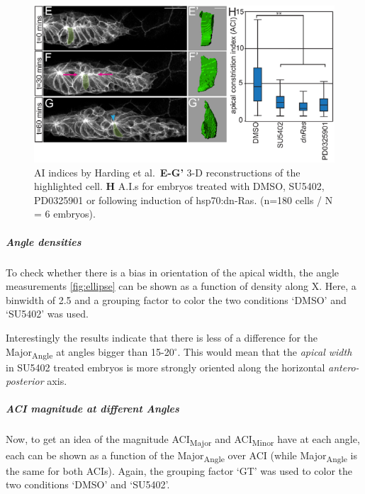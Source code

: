 \documentclass[11pt,singlespacinge,twoside]{reedthesis} %
\begin{document}
\begin{figure}

{\centering \includegraphics[width=0.6\linewidth]{figures/materials/models/harding} 

}

\caption[AI indices by Harding et al.]{AI indices by Harding et al.~\textbf{E-G'} 3-D reconstructions of the highlighted cell. \textbf{H} A.I.s for embryos treated with DMSO, SU5402, PD0325901 or following induction of hsp70:dn-Ras. (n=180 cells / N = 6 embryos).}\label{fig:HardingACI}
\end{figure}
\hypertarget{ACI-Angledens}{%
\subparagraph{Angle densities}\label{ACI-Angledens}}

To check whether there is a bias in orientation of the apical width, the angle measurements \ref{fig:ellipse} can be shown as a function of density along X. Here, a binwidth of 2.5 and a grouping factor to color the two conditions `DMSO' and `SU5402' was used.

\noindent Interestingly the results indicate that there is less of a difference for the Major\textsubscript{Angle} at angles bigger than 15-20\(^\circ\). This would mean that the \emph{apical width} in SU5402 treated embryos is more strongly oriented along the horizontal \emph{antero-posterior} axis.

\hypertarget{ACI-mag}{%
\subparagraph{ACI magnitude at different Angles}\label{ACI-mag}}

Now, to get an idea of the magnitude ACI\textsubscript{Major} and ACI\textsubscript{Minor} have at each angle, each can be shown as a function of the Major\textsubscript{Angle} over ACI (while Major\textsubscript{Angle} is the same for both ACIs). Again, the grouping factor `GT' was used to color the two conditions `DMSO' and `SU5402'.
\end{document}
